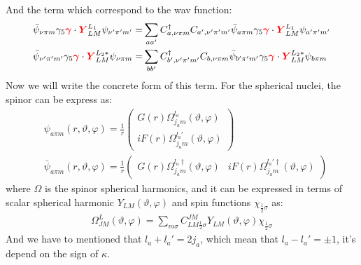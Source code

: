 \documentclass[a4paper]{article}
\newcommand{\bmm}[1]{{\color{red}\bm{#1}}}
\begin{document}
And the term which correspond to the wav function:
\begin{align}
\bar{\psi}_{\nu\pi m}\gamma_{5}\bmm{\gamma}\cdot\bmm{Y}_{LM}^{L_{1}}\psi_{\nu'\pi'm'}=&\sum_{aa'}C_{a,\nu\pi m}^{\dag}C_{a',\nu'\pi'm'}\bar{\psi}_{a\pi m}\gamma_{5}\bmm{\gamma}\cdot\bmm{Y}_{LM}^{L_{1}}\psi_{a'\pi'm'}\label{equ:a}\\
\bar{\psi}_{\nu'\pi'm'}\gamma_{5}\bmm{\gamma}\cdot\bmm{Y}_{LM}^{L_{2}*}\psi_{\nu \pi m}=&\sum_{bb'}C_{b',\nu'\pi'm'}^{\dag}C_{b,\nu\pi m}\bar{\psi}_{b'\pi'm'}\gamma_{5}\bmm{\gamma}\cdot\bmm{Y}_{LM}^{L_{2}*}\psi_{b\pi m}\label{equ:b}
\end{align}
Now we will write the concrete form of this term. For the spherical nuclei, the spinor can be express as:
\begin{align}
\label{equ:wav1}&\psi_{a\pi m}(r,\vartheta,\varphi)=\frac{1}{r}\left(\begin{array}{c}G(r)\Omega_{j_{a}m}^{l_{a}}(\vartheta,\varphi)\\iF(r)\Omega_{j_{a}m}^{l_{a}'}(\vartheta,\varphi)\end{array}\right)\\
\label{equ:wav2}&\bar{\psi}_{a\pi m}(r,\vartheta,\varphi)=\frac{1}{r}\left(\begin{array}{cc}G(r)\Omega_{j_{a}m}^{l_{a}\dag}(\vartheta,\varphi)&iF(r)\Omega_{j_{a}m}^{l_{a}'\dag}(\vartheta,\varphi)\end{array}\right)
\end{align}
where $\Omega$ is the spinor spherical harmonics, and it can be expressed in terms of scalar spherical harmonic $Y_{LM}(\vartheta,\varphi)$ and spin functions $\chi_{\frac{1}{2}\sigma}$ as:
\begin{align}
\Omega_{JM}^{L}(\vartheta,\varphi)=\sum_{m\sigma}C_{LM\frac{1}{2}\sigma}^{JM}Y_{LM}(\vartheta,\varphi)\chi_{\frac{1}{2}\sigma}
\end{align}
And we have to mentioned that $l_{a}+l_{a}'=2j_{a}$, which mean that $l_{a}-l_{a}'=\pm1$, it's depend on the sign of $\kappa$.
\end{document}
